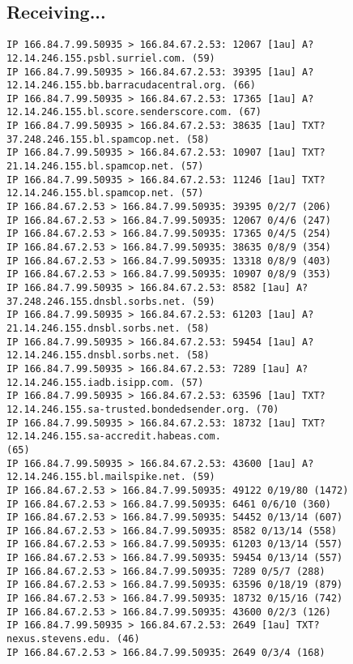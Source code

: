 \documentclass[xga]{xdvislides}
\begin{document}
\subsection{Receiving...}
\small
\begin{verbatim}
IP 166.84.7.99.50935 > 166.84.67.2.53: 12067 [1au] A? 12.14.246.155.psbl.surriel.com. (59)
IP 166.84.7.99.50935 > 166.84.67.2.53: 39395 [1au] A? 12.14.246.155.bb.barracudacentral.org. (66)
IP 166.84.7.99.50935 > 166.84.67.2.53: 17365 [1au] A? 12.14.246.155.bl.score.senderscore.com. (67)
IP 166.84.7.99.50935 > 166.84.67.2.53: 38635 [1au] TXT? 37.248.246.155.bl.spamcop.net. (58)
IP 166.84.7.99.50935 > 166.84.67.2.53: 10907 [1au] TXT? 21.14.246.155.bl.spamcop.net. (57)
IP 166.84.7.99.50935 > 166.84.67.2.53: 11246 [1au] TXT? 12.14.246.155.bl.spamcop.net. (57)
IP 166.84.67.2.53 > 166.84.7.99.50935: 39395 0/2/7 (206)
IP 166.84.67.2.53 > 166.84.7.99.50935: 12067 0/4/6 (247)
IP 166.84.67.2.53 > 166.84.7.99.50935: 17365 0/4/5 (254)
IP 166.84.67.2.53 > 166.84.7.99.50935: 38635 0/8/9 (354)
IP 166.84.67.2.53 > 166.84.7.99.50935: 13318 0/8/9 (403)
IP 166.84.67.2.53 > 166.84.7.99.50935: 10907 0/8/9 (353)
IP 166.84.7.99.50935 > 166.84.67.2.53: 8582 [1au] A? 37.248.246.155.dnsbl.sorbs.net. (59)
IP 166.84.7.99.50935 > 166.84.67.2.53: 61203 [1au] A? 21.14.246.155.dnsbl.sorbs.net. (58)
IP 166.84.7.99.50935 > 166.84.67.2.53: 59454 [1au] A? 12.14.246.155.dnsbl.sorbs.net. (58)
IP 166.84.7.99.50935 > 166.84.67.2.53: 7289 [1au] A? 12.14.246.155.iadb.isipp.com. (57)
IP 166.84.7.99.50935 > 166.84.67.2.53: 63596 [1au] TXT? 12.14.246.155.sa-trusted.bondedsender.org. (70)
IP 166.84.7.99.50935 > 166.84.67.2.53: 18732 [1au] TXT? 12.14.246.155.sa-accredit.habeas.com.
(65)
IP 166.84.7.99.50935 > 166.84.67.2.53: 43600 [1au] A? 12.14.246.155.bl.mailspike.net. (59)
IP 166.84.67.2.53 > 166.84.7.99.50935: 49122 0/19/80 (1472)
IP 166.84.67.2.53 > 166.84.7.99.50935: 6461 0/6/10 (360)
IP 166.84.67.2.53 > 166.84.7.99.50935: 54452 0/13/14 (607)
IP 166.84.67.2.53 > 166.84.7.99.50935: 8582 0/13/14 (558)
IP 166.84.67.2.53 > 166.84.7.99.50935: 61203 0/13/14 (557)
IP 166.84.67.2.53 > 166.84.7.99.50935: 59454 0/13/14 (557)
IP 166.84.67.2.53 > 166.84.7.99.50935: 7289 0/5/7 (288)
IP 166.84.67.2.53 > 166.84.7.99.50935: 63596 0/18/19 (879)
IP 166.84.67.2.53 > 166.84.7.99.50935: 18732 0/15/16 (742)
IP 166.84.67.2.53 > 166.84.7.99.50935: 43600 0/2/3 (126)
IP 166.84.7.99.50935 > 166.84.67.2.53: 2649 [1au] TXT? nexus.stevens.edu. (46)
IP 166.84.67.2.53 > 166.84.7.99.50935: 2649 0/3/4 (168)
\end{verbatim}
\Normalsize
\end{document}
